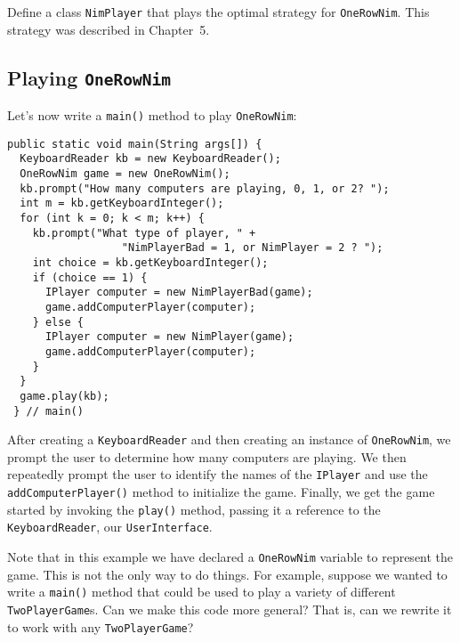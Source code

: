 \pagebreak
{}
\label{self-study-exercises}
\begin{SSTUDY}

\item Define a class {\tt NimPlayer} that plays the optimal strategy
for {\tt OneRowNim}. This strategy was described in Chapter~5. 

\end{SSTUDY}

\subsection{Playing {\tt OneRowNim}}

Let's now write a {\tt main()} method to play {\tt OneRowNim}:

\begin{jjjlisting}[26.5pc]
\begin{lstlisting}
public static void main(String args[]) {
  KeyboardReader kb = new KeyboardReader();
  OneRowNim game = new OneRowNim();
  kb.prompt("How many computers are playing, 0, 1, or 2? ");
  int m = kb.getKeyboardInteger();
  for (int k = 0; k < m; k++) {
    kb.prompt("What type of player, " + 
                  "NimPlayerBad = 1, or NimPlayer = 2 ? ");
    int choice = kb.getKeyboardInteger();
    if (choice == 1) {
      IPlayer computer = new NimPlayerBad(game);
      game.addComputerPlayer(computer);
    } else {
      IPlayer computer = new NimPlayer(game);
      game.addComputerPlayer(computer);
    }
  }
  game.play(kb);
 } // main()
\end{lstlisting}
\end{jjjlisting}

\noindent After creating a {\tt KeyboardReader} and then creating an
instance of {\tt OneRowNim}, we prompt the user to determine how many
computers are playing. We then repeatedly prompt the user to identify
the names of the {\tt IPlayer} and use the {\tt addComputerPlayer()}
method to initialize the game.  Finally, we get the game started by
invoking the {\tt play()} method, passing it a reference to the {\tt
KeyboardReader}, our {\tt UserInterface}.

Note that in this example we have declared a {\tt OneRowNim} variable
to represent the game.  This is not the only way to do things.  For
example, suppose we wanted to write a {\tt main()} method that could
be used to play a variety of different {\tt TwoPlayerGame}s.  Can we
make this code more general? That is, can we rewrite it to work with
any {\tt TwoPlayerGame}?


